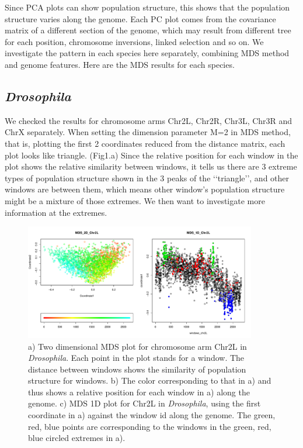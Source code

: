 \documentclass[11pt, oneside]{article}   	%
\begin{document}
\noindent Since PCA plots can show population structure, this shows that the population structure varies along the genome. Each PC plot comes from the covariance matrix of a different section of the genome, which may result from different tree for each position, chromosome inversions, linked selection and so on. We investigate the pattern in each species here separately, combining MDS method and genome features.
Here are the MDS results for each species.
\subsection{\textit{Drosophila}}
We checked the results for chromosome arms Chr2L, Chr2R, Chr3L, Chr3R and ChrX separately. When setting the dimension parameter M=2 in MDS method, that is, plotting the first 2 coordinates reduced from the distance matrix, each plot looks like triangle.
(Fig1.a) Since the relative position for each window in the plot shows the relative similarity between windows, it tells us there are 3 extreme types of population structure shown in the 3 peaks of the \lq\lq triangle\rq\rq, and other windows are between them, which means other window's population structure might be a mixture of those extremes. We then want to investigate more information at the extremes.

\begin{figure}
    \begin{center}
       \includegraphics[width=0.9\textwidth]{Fig1_Together_MDS_plot_Chr2L}
    \end{center}
    \caption{
         a) Two dimensional MDS plot for chromosome arm Chr2L in \textit{Drosophila}. Each point in the plot stands for a window. The distance between windows shows the similarity of population structure for windows. b) The color corresponding to that in a) and thus shows a relative position for each window in a) along the genome. c) MDS 1D plot for Chr2L in \textit{Drosophila}, using the first coordinate in a) against the window id along the genome. The green, red, blue points are corresponding to the windows in the green, red, blue circled extremes in a).
        \label{fig:pde_clines}
    }
\end{figure}
\end{document}
